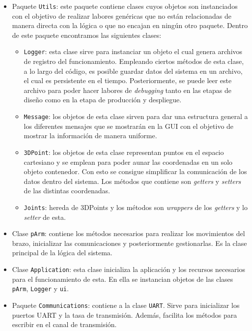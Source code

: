 \begin{itemize}
    \item Paquete \texttt{Utils}: este paquete contiene clases cuyos objetos son instanciados con el objetivo de realizar labores genéricas que no están relacionadas de manera directa con la lógica o que no encajan en ningún otro paquete. Dentro de este paquete encontramos las siguientes clases:
    \begin{itemize}
        \item \texttt{Logger}: esta clase sirve para instanciar un objeto el cual genera archivos de registro del funcionamiento. Empleando ciertos métodos de esta clase, a lo largo del código, es posible guardar datos del sistema en un archivo, el cual es persistente en el tiempo. Posteriormente, se puede leer este archivo para poder hacer labores de \textit{debugging} tanto en las etapas de diseño como en la etapa de producción y despliegue.
        \item \texttt{Message}: los objetos de esta clase sirven para dar una estructura general a los diferentes mensajes que se mostrarán en la GUI con el objetivo de mostrar la información de manera uniforme.
        \item \texttt{3DPoint}: los objetos de esta clase representan puntos en el espacio cartesiano y se emplean para poder aunar las coordenadas en un solo objeto contenedor. Con esto se consigue simplificar la comunicación de los datos dentro del sistema. Los métodos que contiene son \textit{getters} y \textit{setters} de las distintas coordenadas.
        \item \texttt{Joints}: hereda de 3DPoints y los métodos son \textit{wrappers} de los \textit{getters} y lo \textit{setter} de esta.
    \end{itemize}
    \item Clase \texttt{pArm}: contiene los métodos necesarios para realizar los movimientos del brazo, inicializar las comunicaciones y posteriormente gestionarlas. Es la clase principal de la lógica del sistema.
    \item Clase \texttt{Application}: esta clase inicializa la aplicación y los recursos necesarios para el funcionamiento de esta. En ella se instancian objetos de las clases \texttt{pArm}, \texttt{Logger} y \texttt{ui}.
    \item Paquete \texttt{Communications}: contiene a la clase \texttt{UART}. Sirve para inicializar los puertos UART y la tasa de transmisión. Además, facilita los métodos para escribir en el canal de transmisión.
\end{itemize}

